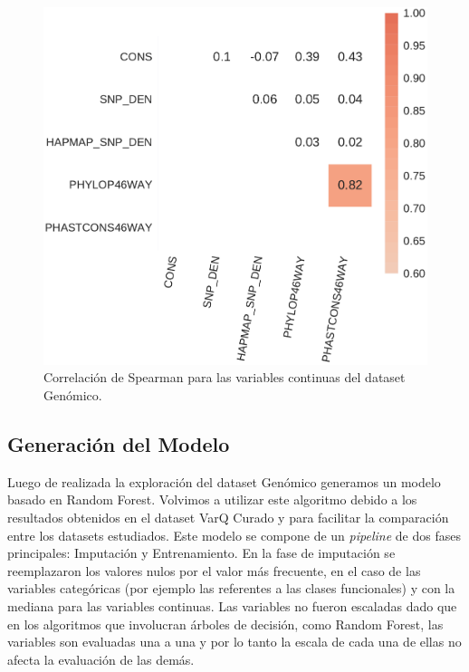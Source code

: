\begin{figure}[H]
    \centering
    \includegraphics[scale=0.7]{documents/latex/figures/3/genomic/genomic_corr.pdf}
    \caption{Correlación de Spearman para las variables continuas del dataset Genómico.}
    \label{fig:corrplot_genomic}
\end{figure}


\subsection{Generación del Modelo}

Luego de realizada la exploración del dataset Genómico generamos un modelo basado en Random Forest. Volvimos a utilizar este algoritmo debido a los resultados obtenidos en el dataset VarQ Curado y para facilitar la comparación entre los datasets estudiados. Este modelo se compone de un \textit{pipeline} de dos fases principales: Imputación y Entrenamiento. En la fase de imputación se reemplazaron los valores nulos por el valor más frecuente, en el caso de las variables categóricas (por ejemplo las referentes a las clases funcionales) y con la mediana para las variables continuas. Las variables no fueron escaladas dado que en los algoritmos que involucran árboles de decisión, como Random Forest, las variables son evaluadas una a una y por lo tanto la escala de cada una de ellas no afecta la evaluación de las demás.

